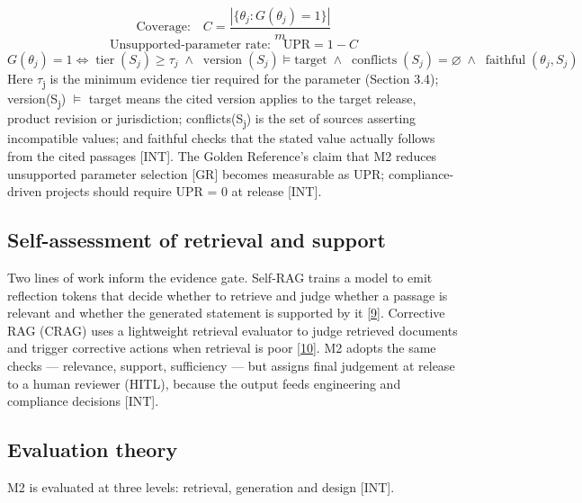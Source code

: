 \documentclass[11pt,a4paper]{article}
\newcommand{\prov}[1]{\textsf{\footnotesize[#1]}}
\begin{document}
\begin{equation*}
\text{Coverage:}\quad C = \frac{\left|\{\theta_j : G(\theta_j) = 1\}\right|}{m}
\end{equation*}
\begin{equation*}
\text{Unsupported-parameter rate:}\quad \mathrm{UPR} = 1 - C
\end{equation*}
\begin{equation*}
G(\theta_j) = 1 \iff \operatorname{tier}(S_j) \ge \tau_j \;\wedge\; \operatorname{version}(S_j) \models \text{target} \;\wedge\; \operatorname{conflicts}(S_j) = \varnothing \;\wedge\; \operatorname{faithful}(\theta_j, S_j)
\end{equation*}
Here \ensuremath{\tau}\textsubscript{j} is the minimum evidence tier required for the parameter (Section 3.4); version(S\textsubscript{j}) \ensuremath{\models} target means the cited version applies to the target release, product revision or jurisdiction; conflicts(S\textsubscript{j}) is the set of sources asserting incompatible values; and faithful checks that the stated value actually follows from the cited passages \prov{INT}. The Golden Reference's claim that M2 reduces unsupported parameter selection \prov{GR} becomes measurable as UPR; compliance-driven projects should require UPR = 0 at release \prov{INT}.

\subsection{Self-assessment of retrieval and support}
Two lines of work inform the evidence gate. Self-RAG trains a model to emit reflection tokens that decide whether to retrieve and judge whether a passage is relevant and whether the generated statement is supported by it \hyperlink{ref9}{[9]}. Corrective RAG (CRAG) uses a lightweight retrieval evaluator to judge retrieved documents and trigger corrective actions when retrieval is poor \hyperlink{ref10}{[10]}. M2 adopts the same checks --- relevance, support, sufficiency --- but assigns final judgement at release to a human reviewer (HITL), because the output feeds engineering and compliance decisions \prov{INT}.

\subsection{Evaluation theory}
M2 is evaluated at three levels: retrieval, generation and design \prov{INT}.
\end{document}
